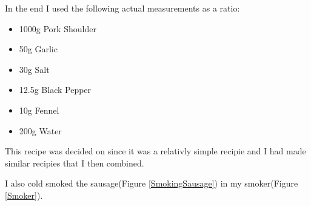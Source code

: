 \documentclass[letterpaper,11pt,leqno]{article}
\begin{document}
In the end I used the following actual measurements as a ratio:

\begin{itemize}
	\item 1000g Pork Shoulder
	\item 50g Garlic
	\item 30g Salt
	\item 12.5g Black Pepper
	\item 10g Fennel
	\item 200g Water
\end{itemize}


This recipe was decided on since it was a relativly simple recipie and I had made similar recipies that I then combined.

I also cold smoked the sausage(Figure \ref{SmokingSausage}) in my smoker(Figure \ref{Smoker}).
\end{document}
